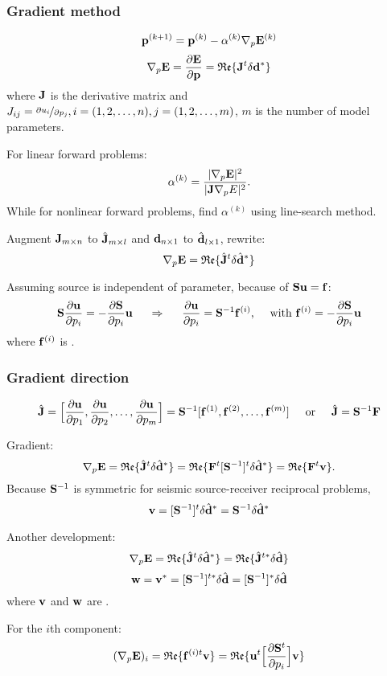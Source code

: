 \subsubsection{Gradient method}
\[ \mathbf{p}^{(k+1)}=\mathbf{p}^{(k)}-\alpha^{(k)}\nabla_p\mathbf{E}^{(k)} \]
\[ \nabla_p\mathbf{E}=\frac{\partial\mathbf{E}}{\partial\mathbf{p}}=\mathfrak{Re}\{\mathbf{J}^t\delta\mathbf{d}^*\} \]
where $\mathbf{J}$ is the \Frechet derivative matrix and $J_{ij}=\nicefrac{\partial u_i}{\partial p_j},i=(1,2,\ldots,n),j=(1,2,\ldots,m)$, $m$ is the number of model parameters.\par
For linear forward problems:
\[ \alpha^{(k)}=\frac{|\nabla_p\mathbf{E}|^2}{|\mathbf{J}\nabla_p E|^2}. \]
While for nonlinear forward problems, find $\alpha^{(k)}$ using line-search method.\par
Augment $\mathbf{J}_{m\times n}$ to $\hat{\mathbf{J}}_{m\times l}$ and $\mathbf{d}_{n\times 1}$ to $\hat{\mathbf{d}}_{l\times 1}$, rewrite:
\[ \nabla_p\mathbf{E}=\mathfrak{Re}\{\hat{\mathbf{J}}^t\delta\hat{\mathbf{d}}^* \} \]\par
Assuming source is independent of parameter, because of $\mathbf{S}\mathbf{u}=\mathbf{f}$:
\[ \mathbf{S}\frac{\partial\mathbf{u}}{\partial p_i}=-\frac{\partial\mathbf{S}}{\partial p_i}\mathbf{u} \hspace{5mm}\Rightarrow\hspace{5mm} \frac{\partial\mathbf{u}}{\partial p_i}=\mathbf{S}^{-1}\mathbf{f}^{(i)} \text{,\hspace{5mm}with~} \mathbf{f}^{(i)}=-\frac{\partial\mathbf{S}}{\partial p_i}\mathbf{u}\]
where $\mathbf{f}^{(i)}$ is .\par
\subsubsection{Gradient direction}
\[ \hat{\mathbf{J}}=\Big[\frac{\partial\mathbf{u}}{\partial p_1},\frac{\partial\mathbf{u}}{\partial p_2},\ldots,\frac{\partial\mathbf{u}}{\partial p_m}\Big]=\mathbf{S}^{-1}[\mathbf{f}^{(1)},\mathbf{f}^{(2)},\ldots,\mathbf{f}^{(m)}] \text{\hspace{5mm}or\hspace{5mm}} \hat{\mathbf{J}}=\mathbf{S}^{-1}\mathbf{F} \]\par
Gradient:
\[ \nabla_p\mathbf{E}=\mathfrak{Re}\{\hat{\mathbf{J}}^t\delta\hat{\mathbf{d}}^*\}=\mathfrak{Re}\{\mathbf{F}^t[\mathbf{S}^{-1}]^t\delta\hat{\mathbf{d}}^*\}=\mathfrak{Re}\{\mathbf{F}^t\mathbf{v}\}. \]
Because $\mathbf{S}^{-1}$ is symmetric for seismic source-receiver reciprocal problems,
\[ \mathbf{v}=[\mathbf{S}^{-1}]^t\delta\hat{\mathbf{d}}^*=\mathbf{S}^{-1}\delta\hat{\mathbf{d}}^* \]\par
Another development:
\[ \nabla_p\mathbf{E}=\mathfrak{Re}\{\hat{\mathbf{J}}^t\delta\hat{\mathbf{d}}^*\}=\mathfrak{Re}\{\hat{\mathbf{J}}^{t*}\delta\hat{\mathbf{d}}\} \]
\[ \mathbf{w}=\mathbf{v}^*=[\mathbf{S}^{-1}]^{t*}\delta\hat{\mathbf{d}}=[\mathbf{S}^{-1}]^*\delta\hat{\mathbf{d}} \]
where $\mathbf{v}$ and $\mathbf{w}$ are .\par
For the $i$th component:
\[ (\nabla_p\mathbf{E})_i=\mathfrak{Re}\{\mathbf{f}^{(i)t}\mathbf{v}\}=\mathfrak{Re}\{\mathbf{u}^t\Big[\frac{\partial\mathbf{S}^t}{\partial p_i}\Big]\mathbf{v}\} \]\par
